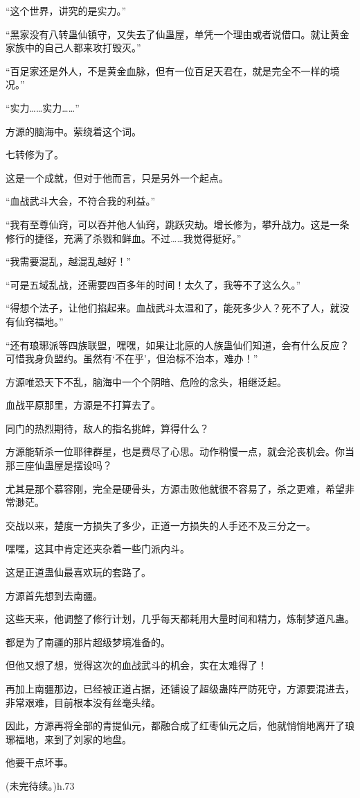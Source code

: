 \begin{this_body}
“这个世界，讲究的是实力。”

“黑家没有八转蛊仙镇守，又失去了仙蛊屋，单凭一个理由或者说借口。就让黄金家族中的自己人都来攻打毁灭。”

“百足家还是外人，不是黄金血脉，但有一位百足天君在，就是完全不一样的境况。”

“实力……实力……”

方源的脑海中。萦绕着这个词。

七转修为了。

这是一个成就，但对于他而言，只是另外一个起点。

“血战武斗大会，不符合我的利益。”

“我有至尊仙窍，可以吞并他人仙窍，跳跃灾劫。增长修为，攀升战力。这是一条修行的捷径，充满了杀戮和鲜血。不过……我觉得挺好。”

“我需要混乱，越混乱越好！”

“可是五域乱战，还需要四百多年的时间！太久了，我等不了这么久。”

“得想个法子，让他们掐起来。血战武斗太温和了，能死多少人？死不了人，就没有仙窍福地。”

“还有琅琊派等四族联盟，嘿嘿，如果让北原的人族蛊仙们知道，会有什么反应？可惜我身负盟约。虽然有‘不在乎’，但治标不治本，难办！”

方源唯恐天下不乱，脑海中一个个阴暗、危险的念头，相继泛起。

血战平原那里，方源是不打算去了。

同门的热烈期待，敌人的指名挑衅，算得什么？

方源能斩杀一位耶律群星，也是费尽了心思。动作稍慢一点，就会沦丧机会。你当那三座仙蛊屋是摆设吗？

尤其是那个慕容刚，完全是硬骨头，方源击败他就很不容易了，杀之更难，希望非常渺茫。

交战以来，楚度一方损失了多少，正道一方损失的人手还不及三分之一。

嘿嘿，这其中肯定还夹杂着一些门派内斗。

这是正道蛊仙最喜欢玩的套路了。

方源首先想到去南疆。

这些天来，他调整了修行计划，几乎每天都耗用大量时间和精力，炼制梦道凡蛊。

都是为了南疆的那片超级梦境准备的。

但他又想了想，觉得这次的血战武斗的机会，实在太难得了！

再加上南疆那边，已经被正道占据，还铺设了超级蛊阵严防死守，方源要混进去，非常艰难，目前根本没有丝毫头绪。

因此，方源再将全部的青提仙元，都融合成了红枣仙元之后，他就悄悄地离开了琅琊福地，来到了刘家的地盘。

他要干点坏事。

(未完待续。)h.73

\end{this_body}

